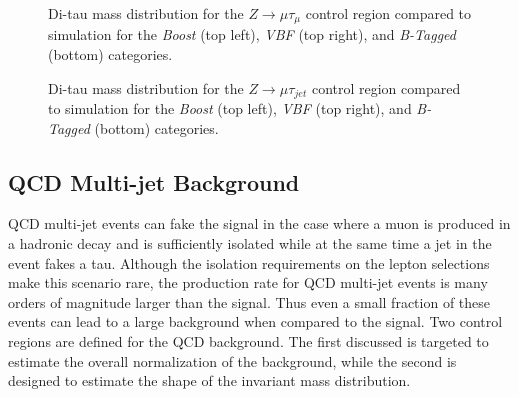 \begin{figure}[tpb]
\centering
{}

\caption{Di-tau mass distribution for the $Z\rightarrow\mu\tau_{\mu}$ control region compared to simulation for the \emph{Boost} (top left), \emph{VBF} (top right), and \emph{B-Tagged} (bottom) categories.}
\label{fig:zmumubiaslow}
\end{figure}
\begin{figure}[tpb]
\centering
{}

\caption{Di-tau mass distribution for the $Z\rightarrow\mu\tau_{jet}$ control region compared to simulation for the \emph{Boost} (top left), \emph{VBF} (top right), and \emph{B-Tagged} (bottom) categories.}
\label{fig:zmujetbiaslow}
\end{figure}



\subsection{QCD Multi-jet Background}
\label{sec:qcdbackground}
QCD multi-jet events can fake the signal in the case where a muon is produced in a hadronic decay and is sufficiently isolated while at the same time a jet in the event fakes a tau.
Although the isolation requirements on the lepton selections make this scenario rare, the production rate for QCD multi-jet events is many orders of magnitude larger than the signal. 
Thus even a small fraction of these events can lead to a large background when compared to the signal.
Two control regions are defined for the QCD background. 
The first discussed is targeted to estimate the overall normalization of the background, while the second is designed to estimate the shape of the invariant mass distribution.

